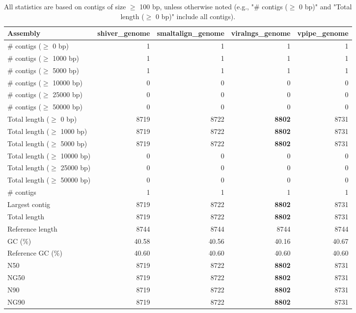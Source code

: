 \documentclass[12pt,a4paper]{article}
\begin{document}
\begin{table}[ht]
\begin{center}
\caption{All statistics are based on contigs of size $\geq$ 100 bp, unless otherwise noted (e.g., "\# contigs ($\geq$ 0 bp)" and "Total length ($\geq$ 0 bp)" include all contigs).}
\begin{tabular}{|l*{4}{|r}|}
\hline
Assembly & shiver\_genome & smaltalign\_genome & viralngs\_genome & vpipe\_genome \\ \hline
\# contigs ($\geq$ 0 bp) & 1 & 1 & 1 & 1 \\ \hline
\# contigs ($\geq$ 1000 bp) & 1 & 1 & 1 & 1 \\ \hline
\# contigs ($\geq$ 5000 bp) & 1 & 1 & 1 & 1 \\ \hline
\# contigs ($\geq$ 10000 bp) & 0 & 0 & 0 & 0 \\ \hline
\# contigs ($\geq$ 25000 bp) & 0 & 0 & 0 & 0 \\ \hline
\# contigs ($\geq$ 50000 bp) & 0 & 0 & 0 & 0 \\ \hline
Total length ($\geq$ 0 bp) & 8719 & 8722 & {\bf 8802} & 8731 \\ \hline
Total length ($\geq$ 1000 bp) & 8719 & 8722 & {\bf 8802} & 8731 \\ \hline
Total length ($\geq$ 5000 bp) & 8719 & 8722 & {\bf 8802} & 8731 \\ \hline
Total length ($\geq$ 10000 bp) & 0 & 0 & 0 & 0 \\ \hline
Total length ($\geq$ 25000 bp) & 0 & 0 & 0 & 0 \\ \hline
Total length ($\geq$ 50000 bp) & 0 & 0 & 0 & 0 \\ \hline
\# contigs & 1 & 1 & 1 & 1 \\ \hline
Largest contig & 8719 & 8722 & {\bf 8802} & 8731 \\ \hline
Total length & 8719 & 8722 & {\bf 8802} & 8731 \\ \hline
Reference length & 8744 & 8744 & 8744 & 8744 \\ \hline
GC (\%) & 40.58 & 40.56 & 40.16 & 40.67 \\ \hline
Reference GC (\%) & 40.60 & 40.60 & 40.60 & 40.60 \\ \hline
N50 & 8719 & 8722 & {\bf 8802} & 8731 \\ \hline
NG50 & 8719 & 8722 & {\bf 8802} & 8731 \\ \hline
N90 & 8719 & 8722 & {\bf 8802} & 8731 \\ \hline
NG90 & 8719 & 8722 & {\bf 8802} & 8731 \\ \hline

\end{tabular}
\end{center}
\end{table}
\end{document}

